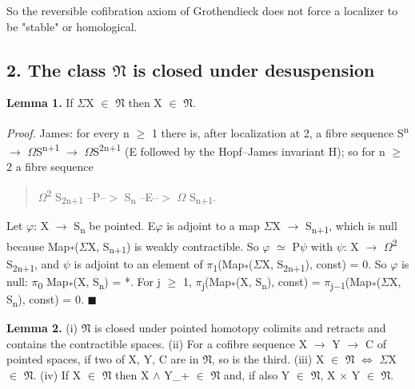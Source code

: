 So the reversible cofibration axiom of Grothendieck does not force a localizer to be "stable" or homological.

\subsection*{2. The class \ensuremath{\mathfrak N} is closed under desuspension}

\textbf{Lemma 1.} If \ensuremath{\Sigma}X \ensuremath{\in} \ensuremath{\mathfrak N} then X \ensuremath{\in} \ensuremath{\mathfrak N}.

\emph{Proof.} James: for every n \ensuremath{\geq} 1 there is, after localization at 2, a fibre sequence S\textsuperscript{n} \ensuremath{\to} \ensuremath{\Omega}S\textsuperscript{n+1} \ensuremath{\to} \ensuremath{\Omega}S\textsuperscript{2n+1} (E followed by the Hopf--James invariant H); so for n \ensuremath{\geq} 2 a fibre sequence

\begin{quote}
\ensuremath{\Omega}\textsuperscript{2} S\textsubscript{2n+1} --P--\ensuremath{>} S\textsubscript{n} --E--\ensuremath{>} \ensuremath{\Omega} S\textsubscript{n+1}.
\end{quote}

Let \ensuremath{\varphi}: X \ensuremath{\to} S\textsubscript{n} be pointed. E\ensuremath{\varphi} is adjoint to a map \ensuremath{\Sigma}X \ensuremath{\to} S\textsubscript{n+1}, which is null because Map\textsubscript{*}(\ensuremath{\Sigma}X, S\textsubscript{n+1}) is weakly contractible. So \ensuremath{\varphi} \ensuremath{\simeq} P\ensuremath{\psi} with \ensuremath{\psi}: X \ensuremath{\to} \ensuremath{\Omega}\textsuperscript{2} S\textsubscript{2n+1}, and \ensuremath{\psi} is adjoint to an element of \ensuremath{\pi}\textsubscript{1}(Map\textsubscript{*}(\ensuremath{\Sigma}X, S\textsubscript{2n+1}), const) = 0. So \ensuremath{\varphi} is null: \ensuremath{\pi}\textsubscript{0} Map\textsubscript{*}(X, S\textsubscript{n}) = *. For j \ensuremath{\geq} 1, \ensuremath{\pi}\textsubscript{j}(Map\textsubscript{*}(X, S\textsubscript{n}), const) = \ensuremath{\pi}\textsubscript{j\ensuremath{-}1}(Map\textsubscript{*}(\ensuremath{\Sigma}X, S\textsubscript{n}), const) = 0. \ensuremath{\blacksquare}

\textbf{Lemma 2.} (i) \ensuremath{\mathfrak N} is closed under pointed homotopy colimits and retracts and contains the contractible spaces. (ii) For a cofibre sequence X \ensuremath{\to} Y \ensuremath{\to} C of pointed spaces, if two of X, Y, C are in \ensuremath{\mathfrak N}, so is the third. (iii) X \ensuremath{\in} \ensuremath{\mathfrak N} \ensuremath{\Leftrightarrow} \ensuremath{\Sigma}X \ensuremath{\in} \ensuremath{\mathfrak N}. (iv) If X \ensuremath{\in} \ensuremath{\mathfrak N} then X \ensuremath{\wedge} Y\_+ \ensuremath{\in} \ensuremath{\mathfrak N} and, if also Y \ensuremath{\in} \ensuremath{\mathfrak N}, X \ensuremath{\times} Y \ensuremath{\in} \ensuremath{\mathfrak N}.

